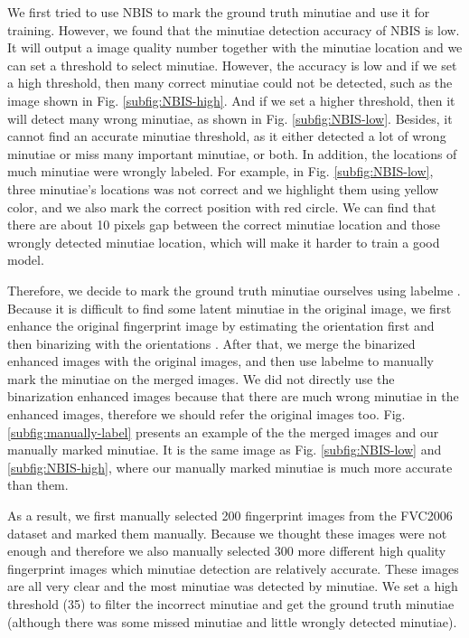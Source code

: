 We first tried to use NBIS \cite{NBIS} to mark the ground truth minutiae and use it for training.
However, we found that the minutiae detection accuracy of NBIS is low.
It will output a image quality number together with the minutiae location and we can set a threshold to select minutiae.
However, the accuracy is low and if we set a high threshold, then many correct minutiae could not be detected, such as the image shown in Fig. \ref{subfig:NBIS-high}.
And if we set a higher threshold, then it will detect many wrong minutiae, as shown in Fig. \ref{subfig:NBIS-low}.
Besides, it cannot find an accurate minutiae threshold, as it either detected a lot of wrong minutiae or miss many important minutiae, or both.
In addition, the locations of much minutiae were wrongly labeled.
For example, in Fig. \ref{subfig:NBIS-low}, three minutiae's locations was not correct and we highlight them using yellow color, and we also mark the correct position with red circle.
We can find that there are about 10 pixels gap between the correct minutiae location and those wrongly detected minutiae location, which will make it harder to train a good model.

Therefore, we decide to mark the ground truth minutiae ourselves using labelme \cite{labelme}.
Because it is difficult to find some latent minutiae in the original image, we first enhance the original fingerprint image by estimating the orientation first and then binarizing with the orientations \cite{caoFingerprintImageEnhancement2017}.
After that, we merge the binarized enhanced images with the original images, and then use labelme to manually mark the minutiae on the merged images.
We did not directly use the binarization enhanced images because that there are much wrong minutiae in the enhanced images, therefore we should refer the original images too.
Fig. \ref{subfig:manually-label} presents an example of the the merged images and our manually marked minutiae.
It is the same image as Fig. \ref{subfig:NBIS-low} and \ref{subfig:NBIS-high}, where our manually marked minutiae is much more accurate than them.

As a result, we first manually selected 200 fingerprint images from the FVC2006 dataset \cite{FVC2006} and marked them manually.
Because we thought these images were not enough and therefore we also manually selected 300 more different high quality fingerprint images which minutiae detection are relatively accurate.
These images are all very clear and the most minutiae was detected by minutiae.
We set a high threshold (35) to filter the incorrect minutiae and get the ground truth minutiae (although there was some missed minutiae and little wrongly detected minutiae).



